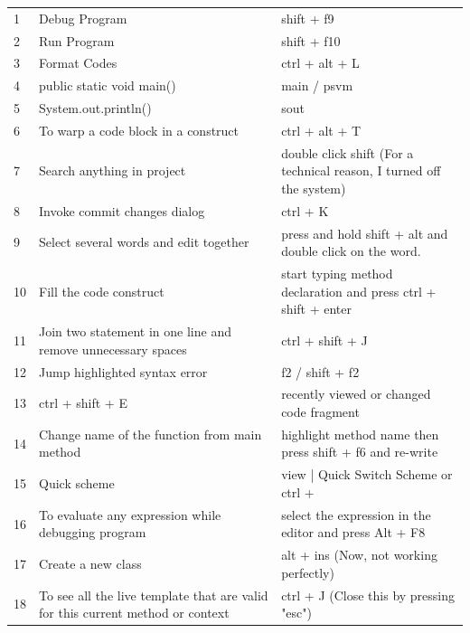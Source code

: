 \begin{center}
	\begin{longtable}{|| m{1 em} || m{15 em} m{17 em} ||}
	\label{IntelliJ IDEA:1}\\
		\hline\hline
		\rowcolor{teal!20}
		\multicolumn{3}{c}{\textbf{\textsf{\textcolor{black}{IntelliJ IDEA Commands and Shortcuts}}}}\\
		\hline\hline
		1 & Debug Program & shift + f9\\
		\hline
		2 & Run Program & shift + f10\\
		\hline
		3 & Format Codes & ctrl + alt + L\\
		\hline
		4 & public static void main() & main / psvm\\
		\hline
		5 & System.out.println() & sout\\
		\hline
		6 & To warp a code block in a construct & ctrl + alt + T\\
		\hline
		7 & Search anything in project & double click shift (For a technical reason, I turned off the system)\\
		\hline
		8 & Invoke commit changes dialog & ctrl + K\\
		\hline
		9 & Select several words and edit together & press and hold shift + alt and double click on the word.\\
		\hline
		10 & Fill the code construct & start typing method declaration and press ctrl + shift + enter\\
		\hline
		11 & Join two statement in one line and remove unnecessary spaces & ctrl + shift + J\\
		\hline
		12 & Jump highlighted syntax error & f2 / shift + f2\\
		\hline
		13 & ctrl + shift + E & recently viewed or changed code fragment\\
		\hline
		14 & Change name of the function from main method & highlight method name then press shift + f6 and re-write\\
		\hline
		\rowcolor{red}
		15 & Quick scheme & view | Quick Switch Scheme or ctrl +  \\
		\hline
		16 & To evaluate any expression while debugging program & select the expression in the editor and press Alt + F8\\
		\hline
		17 & Create a new class & alt + ins (Now, not working perfectly)\\
		\hline
		18 & To see all the live template that are valid for this current method or context & ctrl + J (Close this by pressing "esc")\\

\end{longtable}
\end{center}
